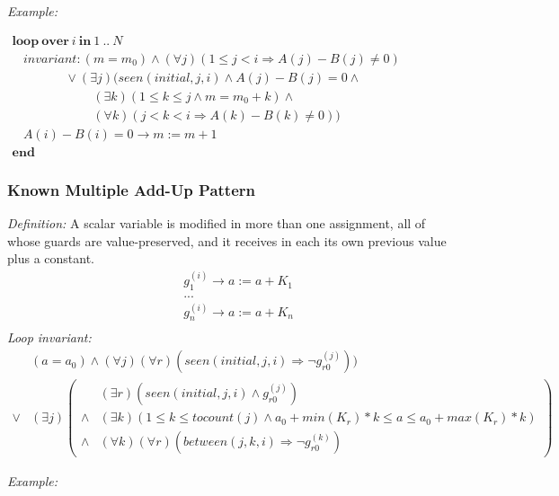 \documentclass[a4paper,10pt]{article}
\newcommand{\idx}{\ensuremath{i}\xspace}
\newcommand{\idxinitial}{\ensuremath{\mathit{initial}}\xspace}
\newcommand{\KWloop}{\ensuremath{\mathrm{\textbf{loop}}~}}
\newcommand{\KWend}{\ensuremath{\mathrm{\textbf{end}}~}}
\newcommand{\KWover}{\ensuremath{\mathrm{\textbf{over}}~}}
\newcommand{\KWin}{\ensuremath{~\mathrm{\textbf{in}}~}}
\newcommand{\at}[1]{{(#1)}}
\newcommand{\impl}{\ensuremath{\Longrightarrow}}
\newcommand{\seen}[3]{\ensuremath{\mathit{seen}{(#1,#2,#3)}}\xspace}
\newcommand{\tocount}[1]{\ensuremath{\mathit{tocount}(#1)}\xspace}
\newcommand{\betweens}[3]{\ensuremath{\mathit{between}{(#1,#2,#3)}}\xspace}
\newcommand{\loopinvariant}{\noindent\textit{Loop invariant:}\xspace}
\newcommand{\patterndef}{\noindent\textit{Definition:}\xspace}
\newcommand{\patternexample}{\noindent\textit{Example:}\xspace}
\begin{document}
\bigskip
\patternexample

\medskip
$\begin{array}{l}
  \KWloop \KWover i \KWin 1~..~N \\
  ~~~~ \textit{invariant}: (m = m_0) \land (\forall j)(1\leq j < i \impl A(j)-B(j)\neq0)\\
  ~~~~~~~~~~~~~~~~~~~ \lor (\exists j)(\seen{\idxinitial}{j}{\idx} \land A(j)-B(j)= 0 \land \\
  ~~~~~~~~~~~~~~~~~~~~~~~~~~~~~ (\exists k)(1 \leq k \leq j \land m = m_0 + k) \land\\
  ~~~~~~~~~~~~~~~~~~~~~~~~~~~~~ (\forall k)(j < k < i \impl A(k)-B(k)\neq0))\\
  ~~~~ A(i)-B(i)=0 \rightarrow m := m+1\\
  \KWend
\end{array}$

\subsubsection*{Known Multiple Add-Up Pattern}

\patterndef A scalar variable is modified in more than one assignment, all of
whose guards are value-preserved, and it receives in each its own previous value
plus a constant.
%
\begin{eqnarray*}
&g_1^\at{\idx} \rightarrow a := a + K_1\\
&...\\
&g_n^\at{\idx} \rightarrow a := a + K_n\\
\end{eqnarray*}
%
\loopinvariant
%
\begin{eqnarray*}
&(a = a_0) \land (\forall j)(\forall r)( \seen{\idxinitial}{j}{\idx} \impl \neg g_{r0}^\at{j})) \\
\lor 
& (\exists j)
\left(\begin{array}{cl}
&(\exists r)(\seen{\idxinitial}{j}{\idx} \land g_{r0}^\at{j}) \\
\land& (\exists k)(1 \leq k \leq \tocount{j} \land a_0 + \mathit{min}(K_r) * k \leq a \leq a_0 + \mathit{max}(K_r) * k) \\
\land& (\forall k)(\forall r)(\betweens{j}{k}{\idx} \impl \neg g_{r0}^\at{k})
\end{array}\right)
\end{eqnarray*}

\bigskip
\patternexample
\end{document}

